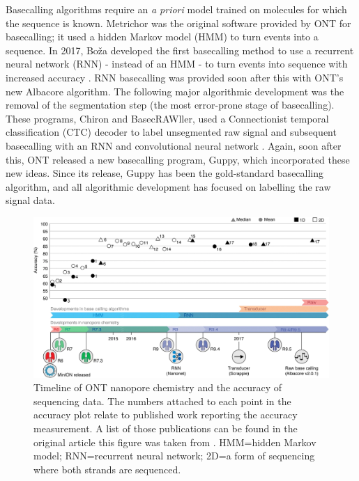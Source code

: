 Basecalling algorithms require an \textit{a priori} model trained on molecules for which the sequence is known. Metrichor was the original software provided by ONT for basecalling; it used a hidden Markov model (HMM) to turn events into a sequence. In 2017, Boža \etal{} developed the first basecalling method to use a recurrent neural network (RNN) - instead of an HMM - to turn events into sequence with increased accuracy \cite{deepnano}. RNN basecalling was provided soon after this with ONT's new Albacore algorithm. The following major algorithmic development was the removal of the segmentation step (the most error-prone stage of basecalling). These programs, Chiron and BasecRAWller, used a Connectionist temporal classification (CTC) decoder to label unsegmented raw signal and subsequent basecalling with an RNN and convolutional neural network \cite{chiron2018,Stoiber2017}. Again, soon after this, ONT released a new basecalling program, Guppy, which incorporated these new ideas. Since its release, Guppy has been the gold-standard basecalling algorithm, and all algorithmic development has focused on labelling the raw signal data.

\begin{figure}
\centering
\includegraphics[width=0.9\columnwidth]{Chapter0/Figs/nanopore_timeline.png}
\caption{Timeline of ONT nanopore chemistry and the accuracy of \ont{} sequencing data. The numbers attached to each point in the accuracy plot relate to published work reporting the accuracy measurement. A list of those publications can be found in the original article this figure was taken from \cite{Rang2018}. HMM=hidden Markov model; RNN=recurrent neural network; 2D=a form of \ont{} sequencing where both strands are sequenced.}
\label{fig:nanopore-timeline}
\end{figure}

